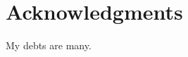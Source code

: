 \chapter{Acknowledgments}\indent%

My debts are many.
  
\begin{comment}

To Diane Ravitch, whose fierce and intellectually rigorous focus on the inequities of public education, I owe my much weaker commitment to changing public policy so that every child gets the education they need to flourish. To Robin Avelar LaSalle, with whom I lost every (friendly) education argument we had during our first dinner, I owe my acceptance into the Ed.D. program at San José State University. Her letter of recommendation was, I'm sure, critical to my getting into the Ed.D. program. Her lifelong focus on righting the inequities in educational policy in California has inspired me. To Roxana Marachi, my dissertation advisor, to whom, put simply, I owe my doctorate. I truly cannot imagine a better committee chair and I hope to accomplish half of what she has. To Gordon Lafer, a committee member, and to XXXX, also a committee member, thank you for pointing out infelicities in my writing and thinking. To Arnie Danzig, Brad Porfilio, and Fergie Revera, Ed.D. Program Directors, I owe much gratitude for their support at critical junctures in my journey to a doctorate. To my long suffering wife, Carol, and to our two children, I owe so much for their tolerance of my quirks, not to mention the vast number of books that crept into every corner of our house. To the professors in the Ed.D. program who did their very best to instill in me the requisites of becoming an education leader, I owe much. To Jennifer Carlstrom, who was the first to guide me on my journey through the thicket of educational policy in California, thank you for getting me started. To Jeff Baier, Sandra McGonagle, and Carrie Bosco (herself an Ed.D. graduate), all senior administrators in the Los Altos School District, thank you for listening graciously to my many suggestions for improvement from someone who has never actually run a school district. Lastly, to Cohort 6 (Class of '22), and especially to Gigi Carunungan and Candice Nance, thank you many times over for your unwavering support (and ceaseless pestering, "Is it done yet?").

Nothing I claim as my own was written by an artificial intelligence program. I am solely responsible for any and all errors in this dissertation.

\end{comment}

